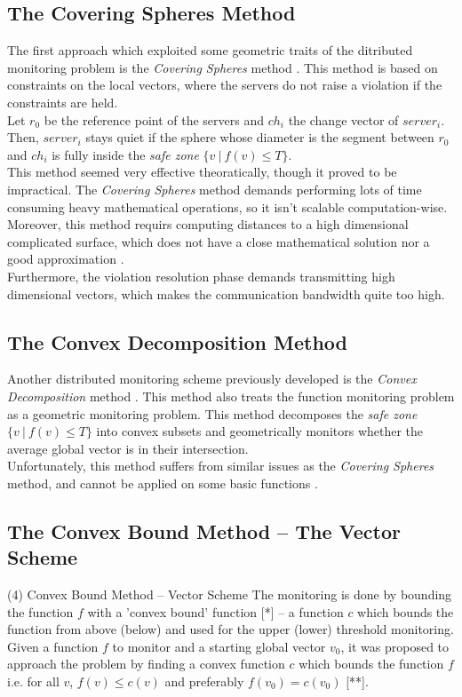 \documentclass[10pt, conference]{IEEEtran}
\begin{document}
\subsection{The Covering Spheres Method}
The first approach which exploited some geometric traits of the ditributed monitoring problem is the \textit{Covering Spheres} method \cite{sharfman2007geometric}. This method is based on constraints on the local vectors, where the servers do not raise a violation if the constraints are held. \\
Let $r_0$ be the reference point of the servers and $ch_i$ the change vector of $server_i$. Then, $server_i$ stays quiet if the sphere whose diameter is the segment between $r_0$ and $ch_i$ is fully inside the \textit{safe zone} ${\{v \ | \ f(v) \leq T\}}$. \\
This method seemed very effective theoratically, though it proved to be impractical. The \textit{Covering Spheres} method demands performing lots of time consuming heavy mathematical operations, so it isn't scalable computation-wise. Moreover, this method requirs computing distances to a high dimensional complicated surface, which does not have a close mathematical solution nor a good  approximation \cite{lazerson2018lightweight}. \\
Furthermore, the violation resolution phase demands transmitting high dimensional vectors, which makes the communication bandwidth quite too high.
\subsection{The Convex Decomposition Method}
Another distributed monitoring scheme previously developed is the \textit{Convex Decomposition} method \cite{lazerson2015monitoring}. This method also treats the function monitoring problem as a geometric monitoring problem. This method decomposes the \textit{safe zone} ${\{v \ | \ f(v) \leq T\}}$ into convex subsets and geometrically monitors whether the average global vector is in their intersection. \\
Unfortunately, this method suffers from similar issues as the \textit{Covering Spheres} method, and cannot be applied on some basic functions \cite{lazerson2018lightweight}.
\subsection{The Convex Bound Method -- The Vector Scheme}
(4) Convex Bound Method -- Vector Scheme
The monitoring is done by bounding the function $f$ with a 'convex bound' function [*] -- a function $c$ which bounds the function from above (below) and used for the upper (lower) threshold monitoring.
Given a function $f$ to monitor and a starting global vector $v_0$, it was proposed to approach the problem by finding a convex function $c$ which bounds the function $f$ i.e. for all $v$, ${f(v) \leq c(v)}$ and preferably ${f(v_0)=c(v_0)}$ [**]. 
\end{document}
